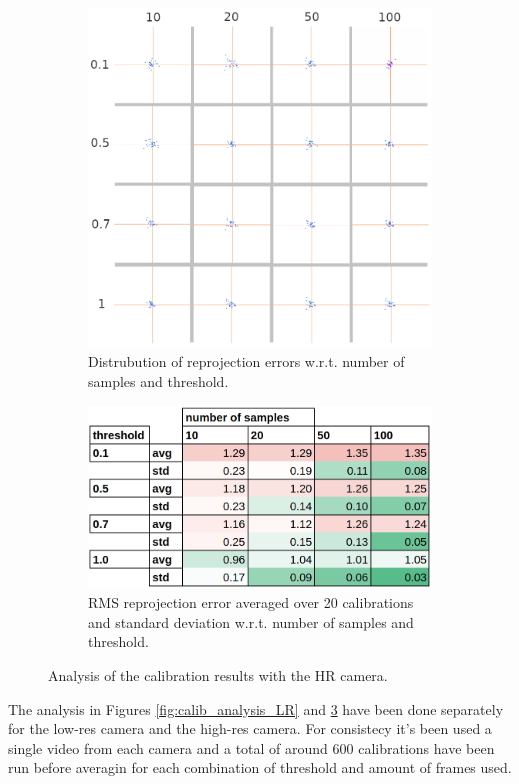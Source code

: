 \begin{figure}[H]
  \centering
  \begin{subfigure}{.5\textwidth}
    \centering
    \includegraphics[width=.8\linewidth]{figures/reprj_dist_HR.png}
    \caption{Distrubution of reprojection errors w.r.t. \newline number of samples and threshold.}
    \label{fig:reprj_dist_HR}
  \end{subfigure}%
  \begin{subfigure}{.5\textwidth}
    \centering
    \includegraphics[width=1\linewidth]{figures/calib_results_table_HR.png}
    \caption{RMS reprojection error averaged over 20 calibrations and standard deviation w.r.t. number of samples and threshold.}
    \label{fig:calib_stats_HR}
  \end{subfigure}
  \caption{Analysis of the calibration results with the HR camera.}
  \label{fig:calib_analysis_HR}
\end{figure}
The analysis in Figures \ref{fig:calib_analysis_LR} and \ref{fig:calib_analysis_HR} have been done separately for the low-res camera and the high-res camera. For consistecy it's been used a single video from each camera and a total of around 600 calibrations have been run before averagin for each combination of threshold and amount of frames used.

